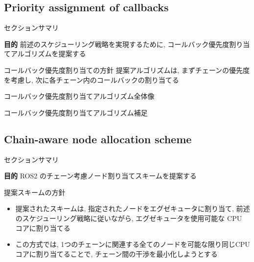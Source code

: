 \subsection{Priority assignment of callbacks}
\label{ssec: priority assignment of callbacks}

\begin{frame}{セクションサマリ}
    \begin{itembox}[l]{\textbf{目的}}
        前述のスケジューリング戦略を実現するために, コールバック優先度割り当てアルゴリズムを提案する
    \end{itembox}
\end{frame}

\begin{frame}{コールバック優先度割り当ての方針}
    提案アルゴリズムは, まずチェーンの優先度を考慮し, 次に各チェーン内のコールバックの割り当てる
\end{frame}

\begin{frame}{コールバック優先度割り当てアルゴリズム全体像}
\end{frame}

\begin{frame}{コールバック優先度割り当てアルゴリズム補足}
\end{frame}


\subsection{Chain-aware node allocation scheme}
\label{ssec: chain-aware node allocation scheme}

\begin{frame}{セクションサマリ}
    \begin{itembox}[l]{\textbf{目的}}
        ROS2 のチェーン考慮ノード割り当てスキームを提案する
    \end{itembox}
\end{frame}

\begin{frame}{提案スキームの方針}
    \begin{itemize}
        \item 提案されたスキームは, 指定されたノードをエグゼキュータに割り当て, 前述のスケジューリング戦略に従いながら, エグゼキュータを使用可能な CPU コアに割り当てる
        \item この方式では, 1つのチェーンに関連する全てのノードを可能な限り同じCPUコアに割り当てることで, チェーン間の干渉を最小化しようとする
    \end{itemize}
\end{frame}

